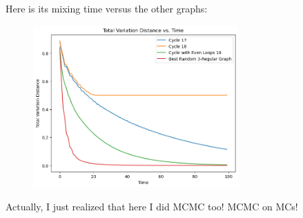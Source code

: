 \documentclass[12pt]{article}
\begin{document}
\begin{enumerate}[label=(\alph*)]
        Here is its mixing time versus the other graphs:
        \begin{figure}[H]
            \centering
            \includegraphics[width=0.7\textwidth]{tv_with_random_graph.png}
        \end{figure}

        Actually, I just realized that here I did MCMC too! MCMC on MCs!
    \end{enumerate}
\end{document}
